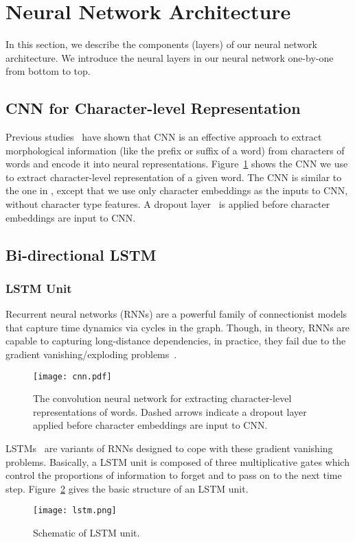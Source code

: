 \documentclass[11pt]{article}
\begin{document}
\section{Neural Network Architecture}
\label{sec:architec}
In this section, we describe the components (layers) of our neural network architecture.
We introduce the neural layers in our neural network one-by-one from bottom to top.

\subsection{CNN for Character-level Representation}
Previous studies~\cite{santos2014learning,chiu2015named} have shown that CNN is an effective approach to extract morphological information (like the prefix or suffix of a word) from characters of words and encode it into neural representations. Figure~\ref{fig:cnn} shows the CNN we use to extract character-level representation of a given word. The CNN is similar to the one in , except that we use only character embeddings as the inputs to CNN, without character type features. A dropout layer~\cite{srivastava2014dropout} is applied before character embeddings are input to CNN.

\subsection{Bi-directional LSTM}
\subsubsection{LSTM Unit}
Recurrent neural networks (RNNs) are a powerful family of connectionist models that capture time
dynamics via cycles in the graph. Though, in theory, RNNs are capable to capturing long-distance dependencies, 
in practice, they fail due to the gradient vanishing/exploding problems~\cite{bengio1994,pascanu2012}.

\begin{figure}[t]
\centering
\texttt{[image: cnn.pdf]}
\caption{The convolution neural network for extracting character-level representations of words. Dashed arrows indicate a dropout layer applied before character embeddings are input to CNN.}
\label{fig:cnn}
\end{figure}

LSTMs~\cite{hochreiter1997long} are variants of RNNs designed to cope with these gradient vanishing problems. Basically, a LSTM unit is composed of three multiplicative gates which control the proportions of information to forget and to pass on to the next time step. Figure~\ref{fig:lstm} gives the basic structure of an LSTM unit.
\begin{figure}[h]
\centering
\texttt{[image: lstm.png]}
\caption{Schematic of LSTM unit.}
\label{fig:lstm}
\end{figure}
\end{document}
